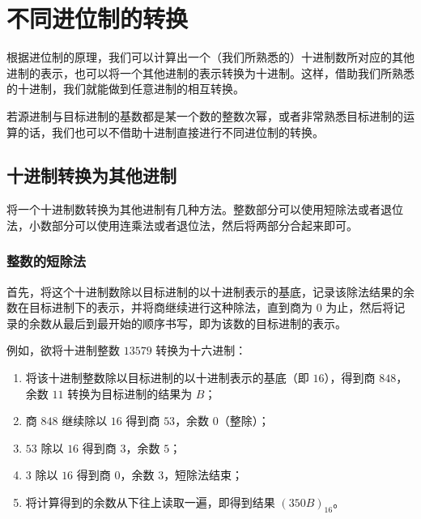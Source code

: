 \section{不同进位制的转换}\label{sec:NumberSystemBasics/positional-notation-conversion}
    根据进位制的原理，我们可以计算出一个（我们所熟悉的）十进制数所对应的其他进制的表示，也可以将一个其他进制的表示转换为十进制。这样，借助我们所熟悉的十进制，我们就能做到任意进制的相互转换。

    若源进制与目标进制的基数都是某一个数的整数次幂，或者非常熟悉目标进制的运算的话，我们也可以不借助十进制直接进行不同进位制的转换。

    \subsection{十进制转换为其他进制}\label{subsec:NumberSystemBasics/positional-notation-conversion/from-decimal}
        将一个十进制数转换为其他进制有几种方法。整数部分可以使用短除法或者退位法，小数部分可以使用连乘法或者退位法，然后将两部分合起来即可。
        \subsubsection{整数的短除法}\label{subsubsec:NumberSystemBasics/positional-notation-conversion/from-decimal/integer-short-division}
            首先，将这个十进制数除以目标进制的以十进制表示的基底，记录该除法结果的余数在目标进制下的表示，并将商继续进行这种除法，直到商为 0 为止，然后将记录的余数从最后到最开始的顺序书写，即为该数的目标进制的表示。

            例如，欲将十进制整数 $13579$ 转换为十六进制：

            \begin{enumerate}
                \item 将该十进制整数除以目标进制的以十进制表示的基底（即 $16$），得到商 $848$，余数 $11$ 转换为目标进制的结果为 $B$；
                \item 商 $848$ 继续除以 $16$ 得到商 $53$，余数 $0$（整除）；
                \item $53$ 除以 $16$ 得到商 $3$，余数 $5$；
                \item $3$ 除以 $16$ 得到商 $0$，余数 $3$，短除法结束；
                \item 将计算得到的余数从下往上读取一遍，即得到结果 $(350B)_{16}$。
            \end{enumerate}

